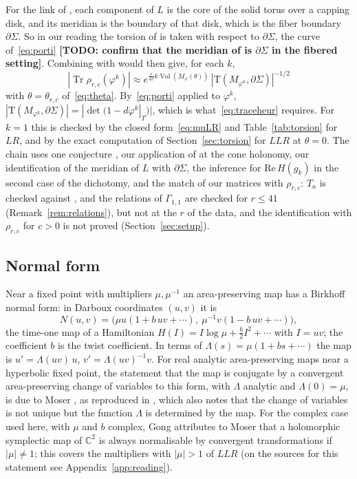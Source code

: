 \documentclass[11pt]{amsart}
\newcommand{\todo}[1]{\textbf{[TODO: #1]}}
\theoremstyle{definition}
\theoremstyle{remark}
\newcommand{\Vol}{\operatorname{Vol}}
\newcommand{\Tr}{\operatorname{Tr}}
\newcommand{\C}{\mathbb{C}}
\begin{document}
For the link of \cite[Thm.~2.3]{DK}, each component of $L$ is the core of the solid
torus over a capping disk, and its meridian is the boundary of that disk, which is the
fiber boundary $\partial\Sigma$. So in our reading the torsion of \cite{WY2} is taken
with respect to $\partial\Sigma$, the curve of~\eqref{eq:porti} \todo{confirm that the
meridian of \cite{WY2} is $\partial\Sigma$ in the fibered setting}. Combining
\cite[Thm.~2.3]{DK} with \cite[Conj.~1.1]{WY2} would then give, for each $k$,
\[
|\Tr\rho_{r,c}(\varphi^k)| \approx e^{\frac{r}{4\pi}k\Vol(M_\varphi(\theta))}
\,|\mathrm{T}(M_{\varphi^k}, \partial\Sigma)|^{-1/2}
\]
with $\theta = \theta_{r,c}$ of~\eqref{eq:theta}. By~\eqref{eq:porti} applied to
$\varphi^k$, $|\mathrm{T}(M_{\varphi^k}, \partial\Sigma)| = |\det(1 - d\varphi^k|_T)|$,
which is what~\eqref{eq:traceheur} requires. For $k = 1$ this is checked by the closed
form~\eqref{eq:muLR} and Table~\ref{tab:torsion} for $LR$, and by the exact
computation of Section~\ref{sec:torsion} for $LLR$ at $\theta = 0$. The chain uses one
conjecture \cite{WY2}, our application of \cite[Prop.~5.9]{Porti} at the cone
holonomy, our identification of the meridian of $L$ with $\partial\Sigma$, the
inference for $\mathrm{Re}\,H(g_k)$ in the second case of the dichotomy, and the
match of our matrices with $\rho_{r,c}$: $T_a$ is checked against \cite{BHMV}, and
the relations of $\Gamma_{1,1}$ are checked for $r \le 41$
(Remark~\ref{rem:relations}), but not at the $r$ of the data, and the identification
with $\rho_{r,c}$ for $c > 0$ is not proved (Section~\ref{sec:setup}).

\subsection{Normal form}\label{sec:normalform}
Near a fixed point with multipliers $\mu, \mu^{-1}$ an area-preserving map has a
Birkhoff normal form: in Darboux coordinates $(u,v)$ it is
\[
N(u,v) = \big(\mu u(1 + b\,uv + \cdots),\ \mu^{-1}v(1 - b\,uv + \cdots)\big),
\]
the time-one map of a Hamiltonian $H(I) = I\log\mu + \tfrac{b}{2} I^2 + \cdots$ with
$I = uv$; the coefficient $b$ is the twist coefficient. In terms of
$\Lambda(s) = \mu(1 + bs + \cdots)$ the map is $u' = \Lambda(uv)\,u$,
$v' = \Lambda(uv)^{-1} v$. For real analytic area-preserving maps near a hyperbolic
fixed point, the statement that the map is conjugate by a convergent area-preserving
change of variables to this form, with $\Lambda$ analytic and $\Lambda(0) = \mu$, is
due to Moser \cite{Moser}, as reproduced in \cite[Section~1]{GG}, which also notes that
the change of variables is not unique but the function $\Lambda$ is determined by the
map. For the complex case used here, with $\mu$ and $b$ complex, Gong
\cite[p.~154]{Gong} attributes to Moser that a holomorphic symplectic map of $\C^2$
is always normalisable by convergent transformations if $|\mu| \ne 1$; this covers the
multipliers with $|\mu| > 1$ of $LLR$ (on the sources for this statement see
Appendix~\ref{app:reading}).
\end{document}
